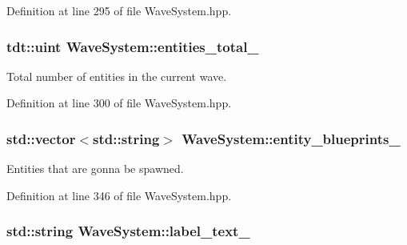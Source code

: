 Definition at line 295 of file Wave\+System.\+hpp.

\subsubsection[{\texorpdfstring{entities\+\_\+total\+\_\+}{entities_total_}}]{\setlength{\rightskip}{0pt plus 5cm}tdt\+::uint Wave\+System\+::entities\+\_\+total\+\_\+\hspace{0.3cm}{\ttfamily [private]}}\hypertarget{class_wave_system_a222d726e4ea7d49ffe856c5ded840938}{}\label{class_wave_system_a222d726e4ea7d49ffe856c5ded840938}


Total number of entities in the current wave. 



Definition at line 300 of file Wave\+System.\+hpp.

\subsubsection[{\texorpdfstring{entity\+\_\+blueprints\+\_\+}{entity_blueprints_}}]{\setlength{\rightskip}{0pt plus 5cm}std\+::vector$<$std\+::string$>$ Wave\+System\+::entity\+\_\+blueprints\+\_\+\hspace{0.3cm}{\ttfamily [private]}}\hypertarget{class_wave_system_a454da77779387bb1f4da83a22880b061}{}\label{class_wave_system_a454da77779387bb1f4da83a22880b061}


Entities that are gonna be spawned. 



Definition at line 346 of file Wave\+System.\+hpp.

\subsubsection[{\texorpdfstring{label\+\_\+text\+\_\+}{label_text_}}]{\setlength{\rightskip}{0pt plus 5cm}std\+::string Wave\+System\+::label\+\_\+text\+\_\+\hspace{0.3cm}{\ttfamily [private]}}\hypertarget{class_wave_system_a1c1cc583c1285417a68295bed7272fe3}{}\label{class_wave_system_a1c1cc583c1285417a68295bed7272fe3}


